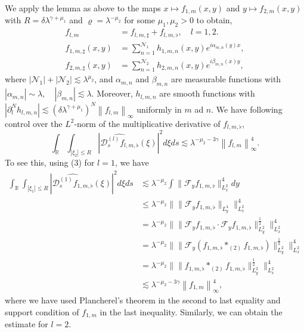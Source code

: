 \documentclass[a4paper,reqno]{amsart}
\theoremstyle{definition}
\theoremstyle{remark}
\numberwithin{equation}{section}
\begin{document}
	We apply the lemma as above to the maps $x \mapsto f_{1, m}(x, y)$ and $y \mapsto f_{2, m}(x, y)$ with $R=\delta\lambda^{\gamma+\mu_1}$ and $\varrho=\lambda^{-\mu_2}$ for some $\mu_1,\mu_2>0$ to obtain,
	\[
	\begin{aligned}
		f_{l, m} & =f_{l, m, \sharp}+f_{l, m, \flat}, \quad l=1,2 . \\
		f_{1, m, \sharp}(x, y) & =\sum_{n=1}^{\mathcal N_1} h_{1, m, n}(x, y) e^{i \alpha_{m, n}(y) x}, \\
		f_{2, m, \sharp}(x, y) & =\sum_{n=1}^{\mathcal N_2} h_{2, m, n}(x, y) e^{i \beta_{m, n}(x) y},
	\end{aligned}
	\]
	where $\left|\mathcal{N}_1\right|+\left|\mathcal{N}_2\right| \lesssim \lambda^{\mu_2}$, and $\alpha_{m,n}$ and $\beta_{m,n}$ are measurable functions with $\left|\alpha_{m, n}\right| \sim \lambda, \quad\left|\beta_{m, n}\right| \lesssim \lambda$.  Moreover, $h_{l, m, n}$ are smooth functions with $\left|\partial_l^N h_{l, m, n}\right| \lesssim (\delta\lambda^{\gamma+\mu_1})^N\left\|f_{l,m}\right\|_{\infty}$ uniformly in $m$ ad $n$. We have following control over the $L^2$-norm of the multiplicative derivative of $f_{l, m, \flat}$,
	\[
	\int_{\mathbb{R}}\int_{\left|\xi_2\right| \leq R}\left|\widehat{\mathscr{D}_s^{(l)} f_{l, m, \flat}}(\xi)\right|^2 d \xi d s \lesssim \lambda^{-\mu_2-3 \gamma}\left\|f_{l,m}\right\|_{\infty}^4.
	\]
	To see this, using (3) for $l=1$, we have
	\begin{align*}
		\int_{\mathbb{R}}\int_{\left|\xi_1\right| \leq R}\left|\widehat{\mathscr{D}_s^{(1)} f_{1, m, \flat}}(\xi)\right|^2 d \xi d s&\lesssim\lambda^{-\mu_2}\int\|\mathcal{F}_yf_{1,m,\flat}\|_{L^2_x}^4dy\\
		&\leq\lambda^{-\mu_2}\Big\|\|\mathcal{F}_yf_{1,m,\flat}\|_{L^4_y}\Big\|_{L^2_x}^4\\
		&=\lambda^{-\mu_2}\Big\|\|\mathcal{F}_yf_{1,m,\flat}\cdot\mathcal{F}_yf_{1,m,\flat}\|_{L^2_y}^{\frac{1}{2}}\Big\|_{L^2_x}^4\\
		&=\lambda^{-\mu_2}\Big\|\|\mathcal{F}_y(f_{1,m,\flat}\ast_{(2)} f_{1,m,\flat})\|_{L^2_y}^{\frac{1}{2}}\Big\|_{L^2_x}^4\\
		&=\lambda^{-\mu_2}\Big\|\|f_{1,m,\flat}\ast_{(2)} f_{1,m,\flat}\|_{L^2_y}^{\frac{1}{2}}\Big\|_{L^2_x}^4\\
		&\lesssim\lambda^{-\mu_2-3 \gamma}\left\|f_{1,m}\right\|_{\infty}^4,
	\end{align*}
	where we have used Plancherel's theorem in the second to last equality and support condition of $f_{1,m}$ in the last inequality. Similarly, we can obtain the estimate for $l=2$.
	
\end{document}

